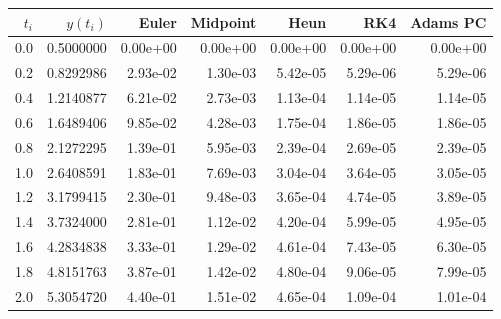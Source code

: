 \begin{tabular}{r r rrrrr}
\hline
$t_i$ & $y(t_i)$ & Euler & Midpoint & Heun & RK4 & Adams PC \\
\hline
0.0 & 0.5000000 & 0.00e+00 & 0.00e+00 & 0.00e+00 & 0.00e+00 & 0.00e+00 \\
0.2 & 0.8292986 & 2.93e-02 & 1.30e-03 & 5.42e-05 & 5.29e-06 & 5.29e-06 \\
0.4 & 1.2140877 & 6.21e-02 & 2.73e-03 & 1.13e-04 & 1.14e-05 & 1.14e-05 \\
0.6 & 1.6489406 & 9.85e-02 & 4.28e-03 & 1.75e-04 & 1.86e-05 & 1.86e-05 \\
0.8 & 2.1272295 & 1.39e-01 & 5.95e-03 & 2.39e-04 & 2.69e-05 & 2.39e-05 \\
1.0 & 2.6408591 & 1.83e-01 & 7.69e-03 & 3.04e-04 & 3.64e-05 & 3.05e-05 \\
1.2 & 3.1799415 & 2.30e-01 & 9.48e-03 & 3.65e-04 & 4.74e-05 & 3.89e-05 \\
1.4 & 3.7324000 & 2.81e-01 & 1.12e-02 & 4.20e-04 & 5.99e-05 & 4.95e-05 \\
1.6 & 4.2834838 & 3.33e-01 & 1.29e-02 & 4.61e-04 & 7.43e-05 & 6.30e-05 \\
1.8 & 4.8151763 & 3.87e-01 & 1.42e-02 & 4.80e-04 & 9.06e-05 & 7.99e-05 \\
2.0 & 5.3054720 & 4.40e-01 & 1.51e-02 & 4.65e-04 & 1.09e-04 & 1.01e-04 \\
\hline
\end{tabular}
